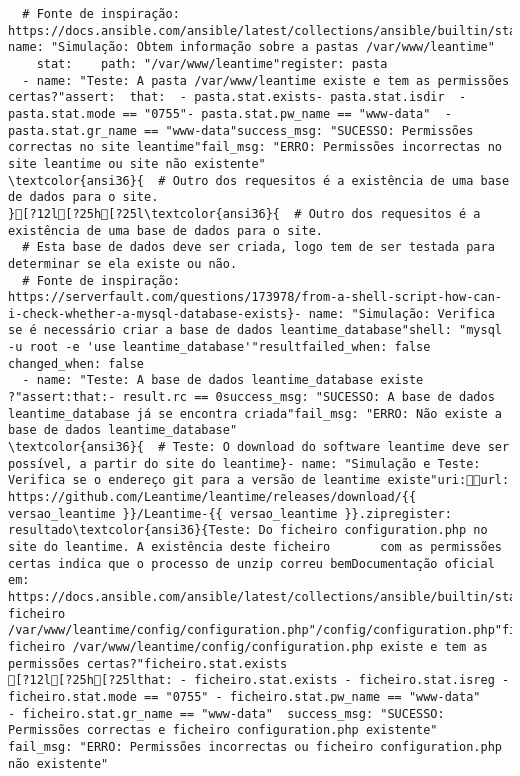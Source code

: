 \documentclass{scrartcl}
\begin{document}
\begin{Verbatim}
  # Fonte de inspiração: https://docs.ansible.com/ansible/latest/collections/ansible/builtin/stat_module.html}- name: "Simulação: Obtem informação sobre a pastas /var/www/leantime"
    stat:    path: "/var/www/leantime"register: pasta
  - name: "Teste: A pasta /var/www/leantime existe e tem as permissões certas?"assert:  that:  - pasta.stat.exists- pasta.stat.isdir  - pasta.stat.mode == "0755"- pasta.stat.pw_name == "www-data"  - pasta.stat.gr_name == "www-data"success_msg: "SUCESSO: Permissões correctas no site leantime"fail_msg: "ERRO: Permissões incorrectas no site leantime ou site não existente"
\textcolor{ansi36}{  # Outro dos requesitos é a existência de uma base de dados para o site.
}[?12l[?25h[?25l\textcolor{ansi36}{  # Outro dos requesitos é a existência de uma base de dados para o site.
  # Esta base de dados deve ser criada, logo tem de ser testada para determinar se ela existe ou não.
  # Fonte de inspiração: https://serverfault.com/questions/173978/from-a-shell-script-how-can-i-check-whether-a-mysql-database-exists}- name: "Simulação: Verifica se é necessário criar a base de dados leantime_database"shell: "mysql -u root -e 'use leantime_database'"resultfailed_when: false  changed_when: false
  - name: "Teste: A base de dados leantime_database existe ?"assert:that:- result.rc == 0success_msg: "SUCESSO: A base de dados leantime_database já se encontra criada"fail_msg: "ERRO: Não existe a base de dados leantime_database"
\textcolor{ansi36}{  # Teste: O download do software leantime deve ser possível, a partir do site do leantime}- name: "Simulação e Teste: Verifica se o endereço git para a versão de leantime existe"uri:url: https://github.com/Leantime/leantime/releases/download/{{ versao_leantime }}/Leantime-{{ versao_leantime }}.zipregister: resultado\textcolor{ansi36}{Teste: Do ficheiro configuration.php no site do leantime. A existência deste ficheiro       com as permissões certas indica que o processo de unzip correu bemDocumentação oficial em: https://docs.ansible.com/ansible/latest/collections/ansible/builtin/stat_module.html}o ficheiro /var/www/leantime/config/configuration.php"/config/configuration.php"ficheiroO ficheiro /var/www/leantime/config/configuration.php existe e tem as permissões certas?"ficheiro.stat.exists
[?12l[?25h[?25lthat: - ficheiro.stat.exists - ficheiro.stat.isreg - ficheiro.stat.mode == "0755" - ficheiro.stat.pw_name == "www-data"    - ficheiro.stat.gr_name == "www-data"  success_msg: "SUCESSO: Permissões correctas e ficheiro configuration.php existente"  fail_msg: "ERRO: Permissões incorrectas ou ficheiro configuration.php não existente"

\end{Verbatim}
\end{document}
